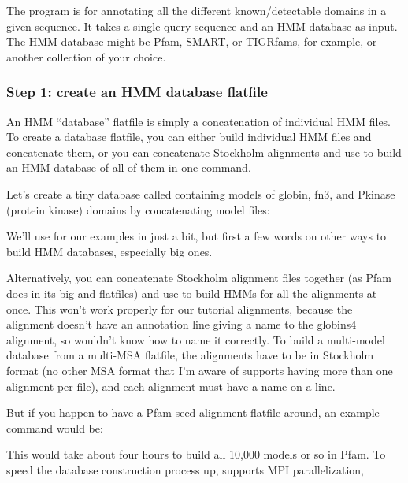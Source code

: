 The  program is for annotating all the different
known/detectable domains in a given sequence. It takes a single query
sequence and an HMM database as input. The HMM database might be Pfam,
SMART, or TIGRfams, for example, or another collection of your choice.

\subsubsection{Step 1: create an HMM database flatfile}

An HMM ``database'' flatfile is simply a concatenation of individual
HMM files. To create a database flatfile, you can either build
individual HMM files and concatenate them, or you can concatenate
Stockholm alignments and use  to build an HMM database
of all of them in one command. 

Let's create a tiny database called  containing models
of globin, fn3, and Pkinase (protein kinase) domains by concatenating
model files:


We'll use  for our examples in just a bit, but first a
few words on other ways to build HMM databases, especially big ones.

Alternatively, you can concatenate Stockholm alignment files together
(as Pfam does in its big  and 
flatfiles) and use  to build HMMs for all the
alignments at once. This won't work properly for our tutorial
alignments, because the  alignment doesn't have an
 annotation line giving a name to the globins4
alignment, so  wouldn't know how to name it
correctly. To build a multi-model database from a multi-MSA flatfile,
the alignments have to be in Stockholm format (no other MSA format
that I'm aware of supports having more than one alignment per file),
and each alignment must have a name on a  line.

But if you happen to have a Pfam seed alignment flatfile
 around, an example command would be:


This would take about four hours to build all 10,000 models or so in
Pfam.  To speed the database construction process up, 
supports MPI parallelization,

